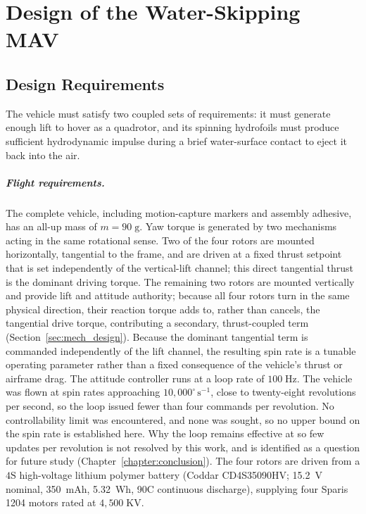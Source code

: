 \chapter{Design of the Water-Skipping MAV}
\label{chapter:paperone}

\section{Design Requirements}
\label{sec:design_requirements}

The vehicle must satisfy two coupled sets of requirements: it must generate
enough lift to hover as a quadrotor, and its spinning hydrofoils must produce
sufficient hydrodynamic impulse during a brief water-surface contact to eject
it back into the air.

\paragraph{Flight requirements.}
The complete vehicle, including motion-capture markers and assembly
adhesive, has an all-up mass of $m = 90\;\mathrm{g}$.  Yaw torque is
generated by two mechanisms acting in the same rotational sense.  Two of
the four rotors are mounted horizontally, tangential to the frame, and are
driven at a fixed thrust setpoint that is set independently of the
vertical-lift channel; this direct tangential thrust is the dominant
driving torque.  The remaining two rotors are mounted vertically and
provide lift and attitude authority; because all four rotors turn in the
same physical direction, their reaction torque adds to, rather than
cancels, the tangential drive torque, contributing a secondary,
thrust-coupled term (Section~\ref{sec:mech_design}).  Because the dominant
tangential term is commanded independently of the lift channel, the
resulting spin rate is a tunable operating parameter rather than a fixed
consequence of the vehicle's thrust or airframe drag.  The attitude
controller runs at a loop rate of $100\;\mathrm{Hz}$.  The vehicle was flown
at spin rates approaching $10{,}000^{\circ}\,\mathrm{s^{-1}}$, close to
twenty-eight revolutions per second, so the loop issued fewer than four
commands per revolution.  No controllability limit was encountered, and none
was sought, so no upper bound on the spin rate is established here.  Why the
loop remains effective at so few updates per revolution is not resolved by
this work, and is identified as a question for future study
(Chapter~\ref{chapter:conclusion}).  The four
rotors are driven from a $4\mathrm{S}$ high-voltage lithium polymer battery
(Coddar CD4S35090HV; \SI{15.2}{V} nominal, \SI{350}{mAh}, \SI{5.32}{Wh}, 90C
continuous discharge), supplying four Sparis \mbox{1204} motors rated at
$4{,}500\;\mathrm{KV}$.

